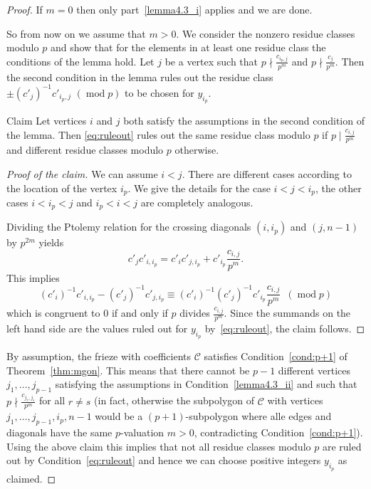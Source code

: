 \documentclass[10pt]{amsart}
\numberwithin{equation}{section}
\theoremstyle{definition}
\theoremstyle{remark}
\newenvironment{enonce*}[2][plain]{\par\noindent\textbf{#2.}\def\currentstyle{#1}\def\remarkstyle{remark}\ifx\currentstyle\remarkstyle\normalfont\else\itshape\fi}{\par}
\DeclareMathOperator{\md}{mod}
\begin{document}
\begin{proof}
If $m=0$ then only part~\ref{lemma4.3_i} applies and we are done. 

So from now on we assume that $m>0$.
We consider the nonzero residue classes modulo $p$ and show that for the elements in at least one
residue class the conditions of the lemma hold. Let $j$ be a vertex such that
$p\nmid \frac{c_{i_p,j}}{p^m}$ and $p\nmid \frac{c_{j}}{p^m}$. Then the second condition 
in the lemma rules out the residue class 
$\pm (c'_j)^{-1} c'_{i_p,j}\,\,(\md p)$ to be chosen for $y_{i_p}$.


\begin{enonce*}{Claim} Let vertices $i$ and $j$ both satisfy the assumptions in the second
condition of the lemma. Then 
\eqref{eq:ruleout} rules out the same residue class modulo $p$
if
$p\mid \frac{c_{i,j}}{p^m}$ and different residue classes modulo $p$ otherwise. 
\end{enonce*}

\begin{proof}[Proof of the claim] We can assume $i<j$. There are different cases according
to the location of the vertex $i_p$. We give the details for the case $i<j<i_p$,
the other cases $i<i_p<j$ and $i_p<i<j$ are completely analogous. 

Dividing the Ptolemy relation for the crossing diagonals $(i,i_p)$ and $(j,n-1)$
by $p^{2m}$ yields 
\[
c'_j c'_{i,i_p} = c'_i c'_{j,i_p} + c'_{i_p} \frac{c_{i,j}}{p^m}.
\]
This implies 
\[
(c'_i)^{-1}c'_{i,i_p} - (c'_j)^{-1}c'_{j,i_p} \equiv 
(c'_i)^{-1}(c'_j)^{-1}c'_{i_p} \frac{c_{i,j}}{p^m}\,\,\,
(\md  p)
\]
which is congruent to 0 if and only if $p$ divides $\frac{c_{i,j}}{p^m}$. Since 
the summands on the left hand side are the values ruled out for $y_{i_p}$
by~\eqref{eq:ruleout}, the claim follows.\let\qed\relax 
\end{proof}

By assumption, the frieze with coefficients $\mathcal{C}$ satisfies Condition~\eqref{cond:p+1} of Theorem~\ref{thm:mgon}.
This means that there cannot be $p-1$ different 
vertices 
$j_1,\ldots, j_{p-1}$ satisfying the assumptions in Condition~\ref{lemma4.3_ii}
and such that
$p\nmid \frac{c_{j_r,j_s}}{p^m}$ for all $r\neq s$ (in fact, 
otherwise the subpolygon of $\mathcal{C}$ with vertices 
$j_1,\ldots,j_{p-1}, i_p, n-1$ would be a $(p+1)$-subpolygon
where alle edges and diagonals have the same $p$-valuation $m>0$, contradicting Condition~\eqref{cond:p+1}).
Using the above claim this implies that not all residue 
classes modulo $p$ are ruled out by Condition~\eqref{eq:ruleout}
and hence we can choose positive integers $y_{i_p}$
as claimed.
\end{proof}
\end{document}
